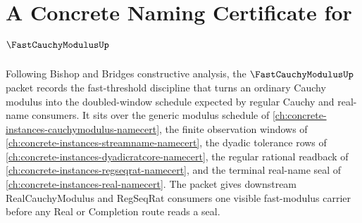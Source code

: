 \chapter{A Concrete Naming Certificate for $\FastCauchyModulusUp$}
\label{ch:concrete-instances-fast-cauchy-modulus-namecert}

Following Bishop and Bridges constructive analysis, the $\FastCauchyModulusUp$ packet records the fast-threshold discipline that turns an ordinary Cauchy modulus into the doubled-window schedule expected by regular Cauchy and real-name consumers. It sits over the generic modulus schedule of \autoref{ch:concrete-instances-cauchymodulus-namecert}, the finite observation windows of \autoref{ch:concrete-instances-streamname-namecert}, the dyadic tolerance rows of \autoref{ch:concrete-instances-dyadicratcore-namecert}, the regular rational readback of \autoref{ch:concrete-instances-regseqrat-namecert}, and the terminal real-name seal of \autoref{ch:concrete-instances-real-namecert}. The packet gives downstream RealCauchyModulus and RegSeqRat consumers one visible fast-modulus carrier before any Real or Completion route reads a seal.

